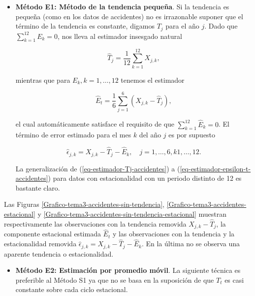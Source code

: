\documentclass[12pt,]{krantz}
\providecommand{\tightlist}{%
  \setlength{\itemsep}{0pt}\setlength{\parskip}{0pt}}
\theoremstyle{definition}
\theoremstyle{definition}
\theoremstyle{definition}
\theoremstyle{remark}
\begin{document}
\begin{itemize}
\tightlist
\item
  \textbf{Método E1: Método de la tendencia pequeña}. Si la tendencia es
  pequeña (como en los datos de accidentes) no es irrazonable suponer
  que el término de la tendencia es constante, digamos \(T_j\) para el
  año \(j\). Dado que \(\sum_{k=1}^{12}E_k=0\), nos lleva al estimador
  insesgado natural

  \begin{equation}
  \hat{T}_j = \frac{1}{12}\sum_{k=1}^{12}X_{j,k},
  \label{eq:eq-estimador-Tj-accidentes}
  \end{equation}

  mientras que para \(E_k, k=1,\ldots,12\) tenemos el estimador

  \begin{equation}
  \hat{E}_t = \frac{1}{6}\sum_{j=1}^6(X_{j,k}-\hat{T}_j),
  \label{eq:eq-estimador-Et-accidentes}
  \end{equation}

  el cual automáticamente satisface el requisito de que
  \(\sum_{k=1}^{12}\hat{E}_k=0\). El término de error estimado para el
  mes \(k\) del año \(j\) es por supuesto

  \begin{equation}
  \hat{\epsilon}_{j,k} = X_{j,k}-\hat{T}_j-\hat{E}_k, \quad j=1,\ldots,6,k1,\ldots,12.
  \label{eq:eq-estimador-epsilon-t-accidentes}
  \end{equation}

  La generalización de (\ref{eq-estimador-Tj-accidentes}) a
  (\ref{eq-estimador-epsilon-t-accidentes}) para datos con
  estacionalidad con un periodo distinto de 12 es bastante claro.
\end{itemize}

Las Figuras \ref{Grafico-tema3-accidentes-sin-tendencia},
\ref{Grafico-tema3-accidentes-estacional} y
\ref{Grafico-tema3-accidentes-sin-tendencia-estacional} muestran
respectivamente las observaciones con la tendencia removida
\(X_{j,k}-\hat{T}_j\), la componente estacional estimada \(\hat{E}_t\) y
las observaciones con la tendencia y la estacionalidad removida
\(\hat{\epsilon}_{j,k}=X_{j,k}-\hat{T}_j-\hat{E}_k\). En la última no se
observa una aparente tendencia o estacionalidad.

\begin{itemize}
\tightlist
\item
  \textbf{Método E2: Estimación por promedio móvil}. La siguiente
  técnica es preferible al Método S1 ya que no se basa en la suposición
  de que \(T_t\) es casi constante sobre cada ciclo estacional.
\end{itemize}
\end{document}
